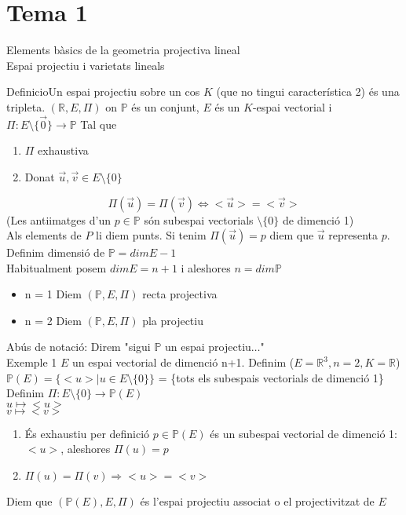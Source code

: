 \documentclass{article}
\newcommand{\red}[2]{{#1}#2}
\newcommand{\R}{\mathds{R}}
\begin{document}
\section{Tema 1}
Elements bàsics de la geometria projectiva lineal\\
Espai projectiu i varietats lineals

\red{Definicio}{Un espai projectiu sobre un cos $K$ (que no tingui característica 2) és una tripleta. $(\R, E, \Pi)$ on $\mathds{P}$ és un conjunt, $E$ és un $K$-espai vectorial i $\Pi:E\setminus\{\vec{0}\}\to\mathds{P}$}
Tal que
\begin{enumerate}
\item $\Pi$ exhaustiva
\item Donat $\vec{u}, \vec{v} \in E\setminus\{0\}$
\end{enumerate}
$$\Pi (\vec{u}) = \Pi (\vec{v}) \Leftrightarrow <\vec{u}> = <\vec{v}>$$
(Les antiimatges d'un $p \in \mathds{P}$ són subespai vectorials $\setminus\{0\}$ de dimenció 1)\\

Als elements de $P$ li diem punts. Si tenim $\Pi (\vec{u}) = p$ diem que $\vec{u}$ representa $p$.\\

Definim dimensió de $\mathds{P} = dim E -1$\\
Habitualment posem $dim E = n +1$ i aleshores $n = dim \mathds{P}$
\begin{itemize}
\item n = 1 Diem $(\mathds{P}, E, \Pi)$ recta projectiva
\item n = 2 Diem $(\mathds{P}, E, \Pi)$ pla projectiu
\end{itemize}

Abús de notació: Direm "sigui $\mathds{P}$ un espai projectiu$\ldots$"\\

Exemple 1 $E$ un espai vectorial de dimenció n+1. Definim ($E=\R^3, n=2, K=\R$)\\
$\mathds{P}(E) = \{<u> | u \in E \setminus\{0\}\}$ = \{tots els subespais vectorials de dimenció 1\}\\

Definim $\Pi: E\setminus\{0\} \to \mathds{P}(E)$\\
$u \mapsto <u>$\\
$v \mapsto <v>$

\begin{enumerate}
\item És exhaustiu per definició $p \in \mathds{P}(E)$ és un subespai vectorial de dimenció 1: $<u>$, aleshores $\Pi(u) = p$
\item $\Pi(u) = \Pi(v) \Rightarrow <u> = <v>$
\end{enumerate}
Diem que $(\mathds{P}(E), E, \Pi)$ és l'espai projectiu associat o el projectivitzat de $E$\\
\end{document}
